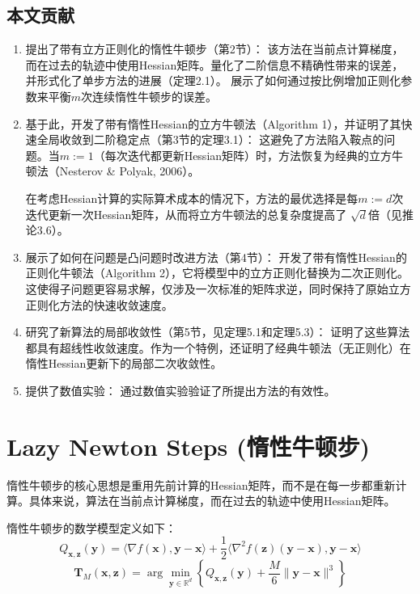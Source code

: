 \documentclass[a4paper,twoside,AutoFakeBold]{article}
\theoremstyle{definition}
\begin{document}
\subsection{本文贡献}
\begin{enumerate}
    \item 提出了带有立方正则化的惰性牛顿步（第2节）：
	该方法在当前点计算梯度，而在过去的轨迹中使用Hessian矩阵。量化了二阶信息不精确性带来的误差，并形式化了单步方法的进展（定理2.1）。
	展示了如何通过按比例增加正则化参数来平衡$m$次连续惰性牛顿步的误差。
	
	\item 基于此，开发了带有惰性Hessian的立方牛顿法（Algorithm 1），并证明了其快速全局收敛到二阶稳定点（第3节的定理3.1）：
	这避免了方法陷入鞍点的问题。当$m:=1$（每次迭代都更新Hessian矩阵）时，方法恢复为经典的立方牛顿法（Nesterov \& Polyak, 2006）。
	
	在考虑Hessian计算的实际算术成本的情况下，方法的最优选择是每$m:=d$次迭代更新一次Hessian矩阵，从而将立方牛顿法的总复杂度提高了
	$\sqrt{d}$倍（见推论3.6）。
	
	\item 展示了如何在问题是凸问题时改进方法（第4节）：
	开发了带有惰性Hessian的正则化牛顿法（Algorithm 2），它将模型中的立方正则化替换为二次正则化。这使得子问题更容易求解，仅涉及一次标准的矩阵求逆，同时保持了原始立方正则化方法的快速收敛速度。
	
	\item 研究了新算法的局部收敛性（第5节，见定理5.1和定理5.3）：
	证明了这些算法都具有超线性收敛速度。作为一个特例，还证明了经典牛顿法（无正则化）在惰性Hessian更新下的局部二次收敛性。
	
	\item 提供了数值实验：
	通过数值实验验证了所提出方法的有效性。
\end{enumerate}




%
\section{Lazy Newton Steps (惰性牛顿步)}
惰性牛顿步的核心思想是重用先前计算的Hessian矩阵，而不是在每一步都重新计算。具体来说，算法在当前点计算梯度，而在过去的轨迹中使用Hessian矩阵。

惰性牛顿步的数学模型定义如下：
\[
Q_{\mathbf{x}, \mathbf{z}}(\mathbf{y}) = \langle \nabla f(\mathbf{x}), \mathbf{y} - \mathbf{x} \rangle + \frac{1}{2} \langle \nabla^{2}f(\mathbf{z})(\mathbf{y} - \mathbf{x}), \mathbf{y} - \mathbf{x} \rangle 
\]
\[
\mathbf{T}_{M}(\mathbf{x},\mathbf{z}) = \arg\min_{\mathbf{y}\in\mathbb{R}^{d}} 
\left\{ Q_{\mathbf{x}, \mathbf{z}}(\mathbf{y}) + \frac{M}{6} \|\mathbf{y} - \mathbf{x}\|^{3} \right\}
\]
\end{document}
